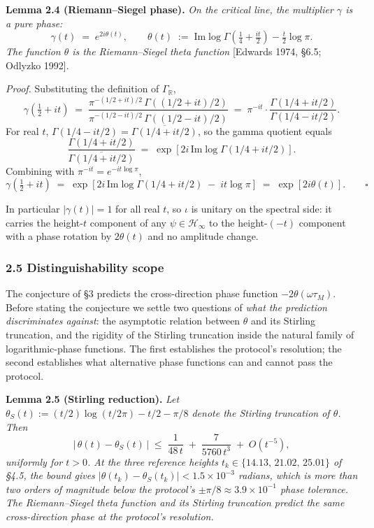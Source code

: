 \documentclass[
  letterpaper,
  11pt]{article}
\theoremstyle{plain}
\theoremstyle{definition}
\theoremstyle{remark}
\begin{document}
\textbf{Lemma 2.4 (Riemann--Siegel phase).} \emph{On the critical line, the multiplier \(\gamma\) is a pure phase:}
\[\gamma(t) \;=\; e^{2i\theta(t)}, \qquad \theta(t) \;:=\; \mathrm{Im}\log\Gamma\!\left(\tfrac{1}{4} + \tfrac{it}{2}\right) - \tfrac{t}{2}\log\pi.\]
\emph{The function \(\theta\) is the Riemann--Siegel theta function} {[}Edwards 1974, §6.5; Odlyzko 1992{]}.

\emph{Proof.} Substituting the definition of \(\Gamma_{\mathbb{R}}\),
\[\gamma\!\left(\tfrac{1}{2} + it\right) \;=\; \frac{\pi^{-(1/2 + it)/2}\,\Gamma\!\left((1/2 + it)/2\right)}{\pi^{-(1/2 - it)/2}\,\Gamma\!\left((1/2 - it)/2\right)} \;=\; \pi^{-it} \cdot \frac{\Gamma(1/4 + it/2)}{\Gamma(1/4 - it/2)}.\]
For real \(t\), \(\Gamma(1/4 - it/2) = \overline{\Gamma(1/4 + it/2)}\), so the gamma quotient equals
\[\frac{\Gamma(1/4 + it/2)}{\overline{\Gamma(1/4 + it/2)}} \;=\; \exp\!\left[2i\,\mathrm{Im}\log\Gamma(1/4 + it/2)\right].\]
Combining with \(\pi^{-it} = e^{-it\log\pi}\),
\[\gamma\!\left(\tfrac{1}{2} + it\right) \;=\; \exp\!\left[2i\,\mathrm{Im}\log\Gamma(1/4 + it/2) \;-\; it\log\pi\right] \;=\; \exp\!\left[2i\theta(t)\right]. \qquad \square\]

In particular \(|\gamma(t)| = 1\) for all real \(t\), so \(\iota\) is unitary on the spectral side: it carries the height-\(t\) component of any \(\psi \in \mathcal{H}_\infty\) to the height-\((-t)\) component with a phase rotation by \(2\theta(t)\) and no amplitude change.

\subsubsection{2.5 Distinguishability scope}\label{distinguishability-scope}

The conjecture of §3 predicts the cross-direction phase function \(-2\theta(\omega\tau_M)\). Before stating the conjecture we settle two questions of \emph{what the prediction discriminates against}: the asymptotic relation between \(\theta\) and its Stirling truncation, and the rigidity of the Stirling truncation inside the natural family of logarithmic-phase functions. The first establishes the protocol's resolution; the second establishes what alternative phase functions can and cannot pass the protocol.

\textbf{Lemma 2.5 (Stirling reduction).} \emph{Let \(\theta_S(t) := (t/2)\log(t/2\pi) - t/2 - \pi/8\) denote the Stirling truncation of \(\theta\). Then}
\[\bigl|\,\theta(t) - \theta_S(t)\,\bigr| \;\leq\; \frac{1}{48\,t} \;+\; \frac{7}{5760\,t^3} \;+\; O(t^{-5}),\]
\emph{uniformly for \(t > 0\). At the three reference heights \(t_k \in \{14.13,\, 21.02,\, 25.01\}\) of §4.5, the bound gives \(|\theta(t_k) - \theta_S(t_k)| < 1.5 \times 10^{-3}\) radians, which is more than two orders of magnitude below the protocol's \(\pm \pi/8 \approx 3.9 \times 10^{-1}\) phase tolerance. The Riemann--Siegel theta function and its Stirling truncation predict the same cross-direction phase at the protocol's resolution.}
\end{document}

